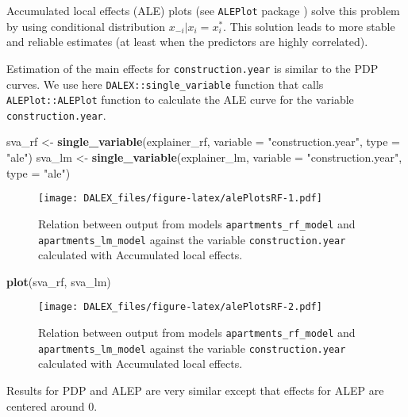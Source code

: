 \documentclass[]{book}
\newenvironment{Shaded}{\begin{snugshade}}{\end{snugshade}}
\newcommand{\DataTypeTok}[1]{\textcolor[rgb]{0.13,0.29,0.53}{#1}}
\newcommand{\KeywordTok}[1]{\textcolor[rgb]{0.13,0.29,0.53}{\textbf{#1}}}
\newcommand{\NormalTok}[1]{#1}
\newcommand{\StringTok}[1]{\textcolor[rgb]{0.31,0.60,0.02}{#1}}
\theoremstyle{definition}
\theoremstyle{definition}
\theoremstyle{definition}
\theoremstyle{remark}
\begin{document}
Accumulated local effects (ALE) plots (see \texttt{ALEPlot} package
\citep{ALEPlot}) solve this problem by using conditional distribution
\(x_{-i}|x_i = x_i^*\). This solution leads to more stable and reliable
estimates (at least when the predictors are highly correlated).

Estimation of the main effects for \texttt{construction.year} is similar
to the PDP curves. We use here \texttt{DALEX::single\_variable} function
that calls \texttt{ALEPlot::ALEPlot} function to calculate the ALE curve
for the variable \texttt{construction.year}.

\begin{Shaded}
\begin{Highlighting}[]
\NormalTok{sva_rf  <-}\StringTok{ }\KeywordTok{single_variable}\NormalTok{(explainer_rf, }\DataTypeTok{variable =} \StringTok{"construction.year"}\NormalTok{, }\DataTypeTok{type =} \StringTok{"ale"}\NormalTok{)}
\NormalTok{sva_lm  <-}\StringTok{ }\KeywordTok{single_variable}\NormalTok{(explainer_lm, }\DataTypeTok{variable =} \StringTok{"construction.year"}\NormalTok{, }\DataTypeTok{type =} \StringTok{"ale"}\NormalTok{)}
\end{Highlighting}
\end{Shaded}

\begin{figure}
\centering
\texttt{[image: DALEX\_files/figure-latex/alePlotsRF-1.pdf]}
\caption{\label{fig:alePlotsRF}Relation between output from models
\texttt{apartments\_rf\_model} and \texttt{apartments\_lm\_model}
against the variable \texttt{construction.year} calculated with
Accumulated local effects.}
\end{figure}

\begin{Shaded}
\begin{Highlighting}[]
\KeywordTok{plot}\NormalTok{(sva_rf, sva_lm)}
\end{Highlighting}
\end{Shaded}

\begin{figure}
\centering
\texttt{[image: DALEX\_files/figure-latex/alePlotsRF-2.pdf]}
\caption{\label{fig:alePlotsRF}Relation between output from models
\texttt{apartments\_rf\_model} and \texttt{apartments\_lm\_model}
against the variable \texttt{construction.year} calculated with
Accumulated local effects.}
\end{figure}

Results for PDP and ALEP are very similar except that effects for ALEP
are centered around 0.
\end{document}
